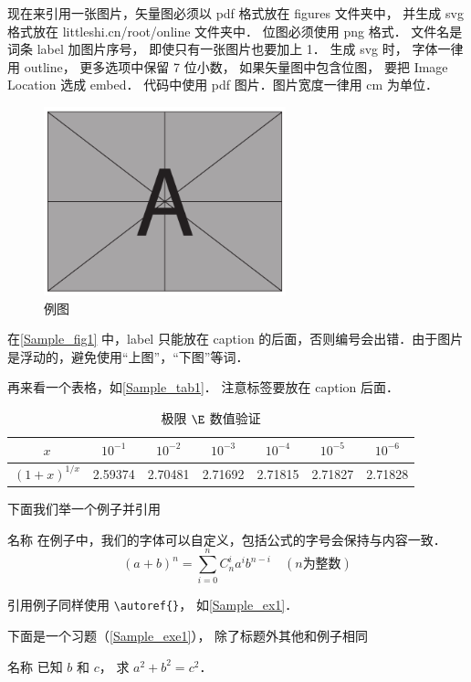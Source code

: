 现在来引用一张图片，矢量图必须以 pdf 格式放在 figures 文件夹中， 并生成 svg 格式放在 littleshi.cn/root/online 文件夹中． 位图必须使用 png 格式． 文件名是词条 label 加图片序号， 即使只有一张图片也要加上 1． 生成 svg 时， 字体一律用 outline， 更多选项中保留 7 位小数， 如果矢量图中包含位图， 要把 Image Location 选成 embed． 代码中使用 pdf 图片．图片宽度一律用 cm 为单位．
\begin{figure}[ht]
\centering
\includegraphics[width=7cm]{./figures/Sample1.pdf}
\caption{例图} \label{Sample_fig1}
\end{figure}
在\autoref{Sample_fig1} 中，label 只能放在 caption 的后面，否则编号会出错．由于图片是浮动的，避免使用“上图”，“下图”等词．

再来看一个表格，如\autoref{Sample_tab1}． 注意标签要放在 caption 后面．
\begin{table}[ht]
\centering
\caption{极限 $\E$ 数值验证}\label{Sample_tab1}
\begin{tabular}{|c|c|c|c|c|c|c|}
\hline
$x$ & ${10^{ - 1}}$ & ${10^{ - 2}}$ & ${10^{ - 3}}$ & ${10^{ - 4}}$ & ${10^{ - 5}}$ & ${10^{ - 6}}$ \\
\hline
$(1 + x)^{1/x}$ & 2.59374 & 2.70481 & 2.71692 & 2.71815 & 2.71827 & 2.71828 \\
\hline
\end{tabular}
\end{table}

下面我们举一个例子并引用

\begin{exam}{名称}\label{Sample_ex1}
在例子中，我们的字体可以自定义，包括公式的字号会保持与内容一致．
\begin{equation}
(a+b)^n = \sum_{i=0}^n C_n^i a^i b^{n-i} \quad (n\text{为整数})
\end{equation}
\end{exam}
引用例子同样使用 \lstinline|\autoref{}|， 如\autoref{Sample_ex1}． 

下面是一个习题（\autoref{Sample_exe1}）， 除了标题外其他和例子相同
\begin{exer}{名称}\label{Sample_exe1}
已知 $b$ 和 $c$， 求 $a^2 + b^2 = c^2$．
\end{exer}

